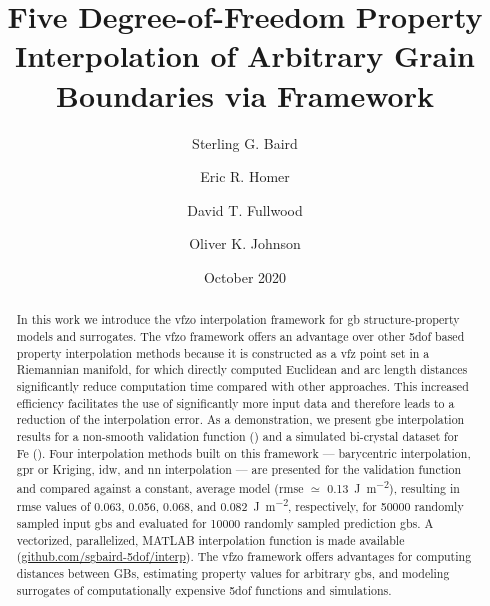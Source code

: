 \documentclass[final,twocolumn,12pt]{elsarticle}
\newcommand{\outpt}{prediction}
\begin{document}
\begin{frontmatter}

\title{Five Degree-of-Freedom Property Interpolation of Arbitrary Grain Boundaries via  Framework}

\author[myu]{Sterling G. Baird}
\author[myu]{Eric R. Homer}
\author[myu]{David T. Fullwood}
\author[myu]{Oliver K. Johnson}

\address[myu]{Department of Mechanical Engineering, Brigham Young University, Provo, UT 84602, USA}


\date{October 2020}

\begin{abstract}
    In this work we introduce the \gls{vfzo} interpolation framework for \gls{gb} structure-property models and surrogates. The \gls{vfzo} framework offers an advantage over other \gls{5dof} based property interpolation methods because it is constructed as a \gls{vfz} point set in a Riemannian manifold, for which directly computed Euclidean and arc length distances significantly reduce computation time compared with other approaches. This increased efficiency facilitates the use of significantly more input data and therefore leads to a reduction of the interpolation error. As a demonstration, we present \gls{gbe} interpolation results for a non-smooth validation function (\citet{bulatovGrainBoundaryEnergy2014}) and a simulated bi-crystal dataset for Fe (\citet{kimPhasefieldModeling3D2014}).
    Four interpolation methods built on this framework --- barycentric interpolation, \gls{gpr} or Kriging, \gls{idw}, and \gls{nn} interpolation --- are presented for the validation function and compared against a constant, average model (\gls{rmse} $\simeq$ \SI{0.13}{\J\per\square\meter}), resulting in \gls{rmse} values of 0.063, 0.056, 0.068, and \SI{0.082}{\J\per\square\meter}, respectively, for \num{50000} randomly sampled input \glspl{gb} and evaluated for \num{10000} randomly sampled \outpt{} \glspl{gb}. A vectorized, parallelized, MATLAB interpolation function is made available (\url{github.com/sgbaird-5dof/interp}). The \gls{vfzo} framework offers advantages for computing distances between GBs, estimating property values for arbitrary \glspl{gb}, and modeling surrogates of computationally expensive \gls{5dof} functions and simulations.
\end{abstract}


\end{frontmatter}
\end{document}
